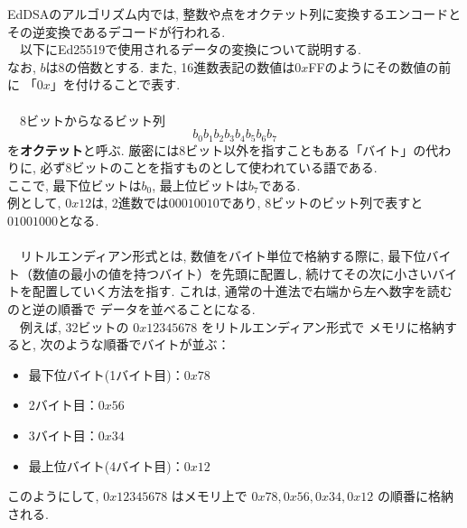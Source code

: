 EdDSAのアルゴリズム内では, 整数や点をオクテット列に変換するエンコードと
その逆変換であるデコードが行われる\cite{インフォーズ}.\\
　以下にEd25519で使用されるデータの変換について説明する.\\
なお, $b$は8の倍数とする. 
また, 16進数表記の数値は$0x$FFのようにその数値の前に
「$0x$」を付けることで表す.\\[1em]

\\
　8ビットからなるビット列
\[
b_0b_1b_2b_3b_4b_5b_6b_7
\]
を\textbf{オクテット}と呼ぶ.
厳密には8ビット以外を指すこともある「バイト」の代わりに, 
必ず8ビットのことを指すものとして使われている語である.\\
ここで, 最下位ビットは$b_0$, 最上位ビットは$b_7$である.\\
\indent 例として, $0x12$は, 2進数では$00010010$であり, 
8ビットのビット列で表すと$01001000$となる.\\ 

\\
　リトルエンディアン形式とは, 数値をバイト単位で格納する際に, 
最下位バイト（数値の最小の値を持つバイト）を先頭に配置し, 
続けてその次に小さいバイトを配置していく方法を指す.
これは, 通常の十進法で右端から左へ数字を読むのと逆の順番で
データを並べることになる.\\
　例えば, 32ビットの $0x12345678$ をリトルエンディアン形式で
メモリに格納すると, 次のような順番でバイトが並ぶ：
\begin{itemize}
  \item 最下位バイト(1バイト目)：$0x78$
  \item 2バイト目：$0x56$
  \item 3バイト目：$0x34$
  \item 最上位バイト(4バイト目)：$0x12$
\end{itemize}
\noindent このようにして, $0x12345678$ はメモリ上で 
$0x78, 0x56, 0x34, 0x12$ の順番に格納される.\\[1em]

